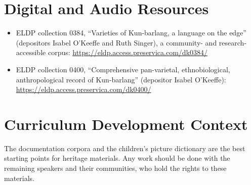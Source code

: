 \documentclass[12pt]{article}
\begin{document}
\section{Digital and Audio Resources}
\begin{itemize}
\item ELDP collection 0384, ``Varieties of Kun-barlang, a language on the edge'' (depositors Isabel O'Keeffe and Ruth Singer), a community- and research-accessible corpus: \url{https://eldp.access.preservica.com/dk0384/}
\item ELDP collection 0400, ``Comprehensive pan-varietal, ethnobiological, anthropological record of Kun-barlang'' (depositor Isabel O'Keeffe): \url{https://eldp.access.preservica.com/dk0400/}
\end{itemize}

\section{Curriculum Development Context}
The documentation corpora and the children's picture dictionary are the best starting points for heritage materials. Any work should be done with the remaining speakers and their communities, who hold the rights to these materials.
\end{document}

